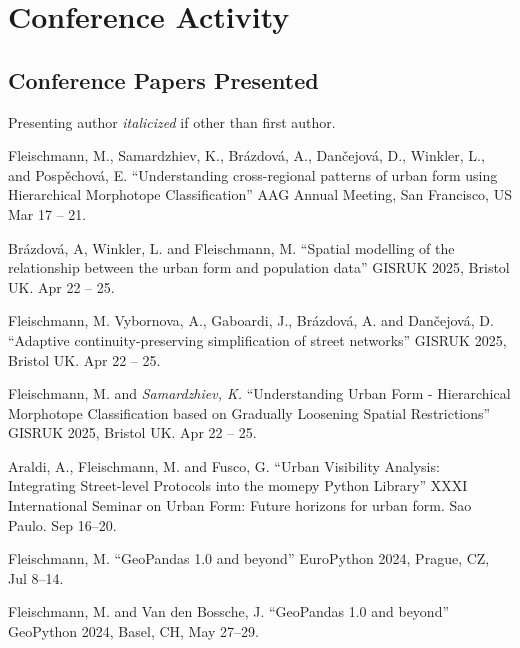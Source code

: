 \documentclass[12pt,a4paper]{report}
\begin{document}
    \section*{Conference Activity}

    \subsection*{Conference Papers Presented}

    Presenting author \textit{italicized} if other than first author.\bigskip

    \begin{tablist}

        \item[2026] \tab{}Fleischmann, M., Samardzhiev, K., Brázdová, A., Dančejová, D., Winkler, L., and Pospěchová, E. \enquote{Understanding cross-regional patterns of urban form using Hierarchical Morphotope Classification} AAG Annual Meeting, San Francisco, US \@ Mar 17 -- 21.

        \item[2025] \tab{}Brázdová, A, Winkler, L. and Fleischmann, M. \enquote{Spatial modelling of the relationship between the urban form and population data} GISRUK 2025, Bristol UK. Apr 22 -- 25.

        \item[2025] \tab{}Fleischmann, M. Vybornova, A., Gaboardi, J., Brázdová, A. and Dančejová, D. \enquote{Adaptive continuity-preserving simplification of street networks} GISRUK 2025, Bristol UK. Apr 22 -- 25.

        \item[2025] \tab{}Fleischmann, M. and \textit{Samardzhiev, K.} \enquote{Understanding Urban Form - Hierarchical Morphotope Classification based on Gradually Loosening Spatial Restrictions} GISRUK 2025, Bristol UK. Apr 22 -- 25.

        \item[2024] \tab{}Araldi, A., Fleischmann, M. and Fusco, G. \enquote{Urban Visibility Analysis: Integrating Street-level Protocols into the momepy Python Library} XXXI International Seminar on Urban Form: Future horizons for urban form. Sao Paulo. \@ Sep 16--20.

        \item[2024] \tab{}Fleischmann, M. \enquote{GeoPandas 1.0 and beyond} EuroPython 2024, Prague, CZ,  \@ Jul 8--14.

        \item[2024] \tab{}Fleischmann, M. and Van den Bossche, J. \enquote{GeoPandas 1.0 and beyond} GeoPython 2024, Basel, CH,  \@ May 27--29.


\end{tablist}
\end{document}
